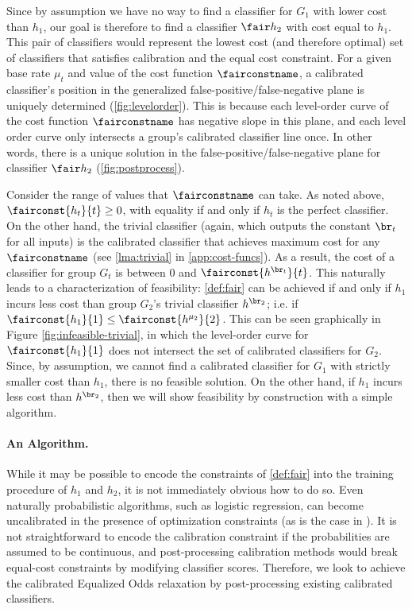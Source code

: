 Since by assumption we have no way to find a classifier for $G_1$ with lower
cost than $h_1$,
our goal is therefore to find
a classifier $\fair h_2$ with cost equal to $h_1$. This pair of classifiers
would represent the lowest cost (and therefore optimal) set of classifiers that
satisfies calibration and the equal cost constraint.
For a given base rate $\mu_t$ and value of the cost
function $\fairconstname$, a calibrated classifier's position in the
generalized false-positive/false-negative plane is uniquely determined
(\autoref{fig:levelorder}).
This is because each level-order
curve of the cost function $\fairconstname$ has negative
slope in this plane, and each level order curve only intersects a group's calibrated
classifier line once.
In other words, there is a unique solution in the false-positive/false-negative
plane for classifier $\fair h_2$ (\autoref{fig:postprocess}).

Consider the range of values that $\fairconstname$ can take. As noted above,
$\fairconst{h_t}{t} \ge 0$, with equality if and only if $h_t$ is the perfect
classifier. On the other hand,
the trivial classifier
(again, which outputs the constant $\br_t$ for all inputs)
is the calibrated classifier that achieves maximum cost for any $\fairconstname$
(see \autoref{lma:trivial} in \autoref{app:cost-funcs}).
As a result, the cost of a classifier for group
$G_t$ is between 0 and $\fairconst{h^{\br_t}}{t}$.
This naturally leads to a characterization of feasibility: \autoref{def:fair}
can be achieved if and only if $h_1$ incurs less cost than group $G_2$'s
trivial classifier $h^{\br_2}$; i.e.
if $\fairconst{h_1}{1} \leq \fairconst{h^{\mu_2}}{2}$.
This can be seen graphically in Figure \ref{fig:infeasible-trivial},
in which the level-order curve for $\fairconst{h_1}{1}$ does not intersect the set
of calibrated classifiers for $G_2$. Since, by assumption, we cannot find a
calibrated classifier for $G_1$ with
strictly smaller cost than $h_1$, there is no feasible solution.
On the other hand, if $h_1$ incurs less cost than $h^{\br_2}$, then we
will show feasibility by construction with a simple algorithm.

\paragraph{An Algorithm.}
While it may be possible to encode the constraints of \autoref{def:fair} into the training
procedure of $h_1$ and $h_2$, it is not immediately obvious how to do so.
Even naturally probabilistic algorithms, such as logistic regression,
can become uncalibrated in the presence of optimization constraints (as
is the case in \cite{zafar2017fairness}). It is not straightforward
to encode the calibration constraint if the probabilities
are assumed to be continuous, and post-processing calibration methods
\cite{platt1999probabilistic,zadrozny2001obtaining}
would break equal-cost constraints by modifying classifier scores.
Therefore, we look to achieve the calibrated Equalized Odds relaxation
by post-processing existing calibrated classifiers.

